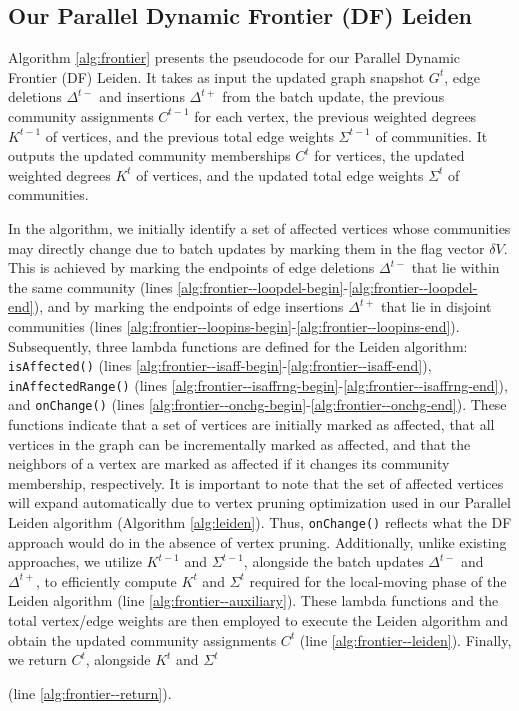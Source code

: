 \subsection{Our Parallel Dynamic Frontier (DF) Leiden}
\label{sec:our-frontier}

Algorithm \ref{alg:frontier} presents the pseudocode for our Parallel Dynamic Frontier (DF) Leiden. It takes as input the updated graph snapshot $G^t$, edge deletions $\Delta^{t-}$ and insertions $\Delta^{t+}$ from the batch update, the previous community assignments $C^{t-1}$ for each vertex, the previous weighted degrees $K^{t-1}$ of vertices, and the previous total edge weights $\Sigma^{t-1}$ of communities. It outputs the updated community memberships $C^t$ for vertices, the updated weighted degrees $K^t$ of vertices, and the updated total edge weights $\Sigma^t$ of communities.



In the algorithm, we initially identify a set of affected vertices whose communities may directly change due to batch updates by marking them in the flag vector $\delta V$. This is achieved by marking the endpoints of edge deletions $\Delta^{t-}$ that lie within the same community (lines \ref{alg:frontier--loopdel-begin}-\ref{alg:frontier--loopdel-end}), and by marking the endpoints of edge insertions $\Delta^{t+}$ that lie in disjoint communities (lines \ref{alg:frontier--loopins-begin}-\ref{alg:frontier--loopins-end}). Subsequently, three lambda functions are defined for the Leiden algorithm: \texttt{isAffected()} (lines \ref{alg:frontier--isaff-begin}-\ref{alg:frontier--isaff-end}), \texttt{inAffectedRange()} (lines \ref{alg:frontier--isaffrng-begin}-\ref{alg:frontier--isaffrng-end}), and \texttt{onChange()} (lines \ref{alg:frontier--onchg-begin}-\ref{alg:frontier--onchg-end}). These functions indicate that a set of vertices are initially marked as affected, that all vertices in the graph can be incrementally marked as affected, and that the neighbors of a vertex are marked as affected if it changes its community membership, respectively. It is important to note that the set of affected vertices will expand automatically due to vertex pruning optimization used in our Parallel Leiden algorithm (Algorithm \ref{alg:leiden}). Thus, \texttt{onChange()} reflects what the DF approach would do in the absence of vertex pruning. Additionally, unlike existing approaches, we utilize $K^{t-1}$ and $\Sigma^{t-1}$, alongside the batch updates $\Delta^{t-}$ and $\Delta^{t+}$, to efficiently compute $K^t$ and $\Sigma^t$ required for the local-moving phase of the Leiden algorithm (line \ref{alg:frontier--auxiliary}). These lambda functions and the total vertex/edge weights are then employed to execute the Leiden algorithm and obtain the updated community assignments $C^t$ (line \ref{alg:frontier--leiden}). Finally, we return $C^t$, alongside $K^t$ and $\Sigma^t$ (line \ref{alg:frontier--return}).




